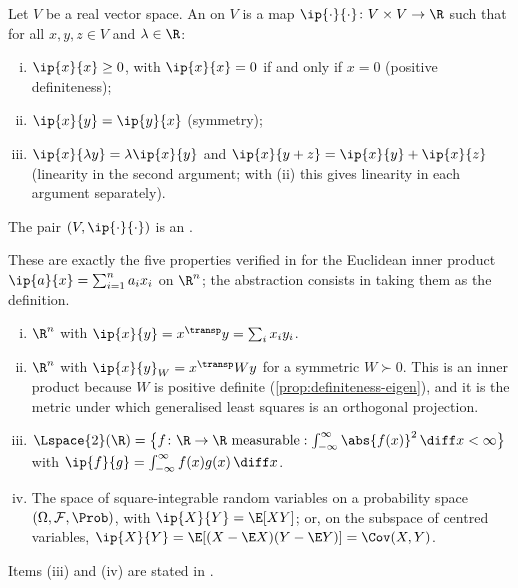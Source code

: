 \begin{definition}\label{def:inner-product}
	Let $V$ be a real vector space. An  on $V$ is a map
	$\ip{\cdot}{\cdot}\colon V\times V\to\R$ such that for all $x,y,z\in V$ and
	$\lambda\in\R$:
	\begin{enumerate}[(i)]
		\item $\ip{x}{x}\geq0$, with $\ip{x}{x}=0$ if and only if $x=0$
		      (positive definiteness);
		\item $\ip{x}{y}=\ip{y}{x}$ (symmetry);
		\item $\ip{x}{\lambda y}=\lambda\ip{x}{y}$ and
		      $\ip{x}{y+z}=\ip{x}{y}+\ip{x}{z}$ (linearity in the second argument;
		      with (ii) this gives linearity in each argument separately).
	\end{enumerate}
	The pair $(V,\ip{\cdot}{\cdot})$ is an .
\end{definition}

These are exactly the five properties verified in
\autocite[slides 5--6]{fukuda2026analysis} for the Euclidean inner product
$\ip{a}{x}=\sum_{i=1}^n a_ix_i$ on $\R^n$; the abstraction consists in taking
them as the definition.

\begin{eg}\label{eg:ip-spaces}
	\begin{enumerate}[(i)]
		\item $\R^n$ with $\ip{x}{y}=x^{\transp}y=\sum_ix_iy_i$.
		\item $\R^n$ with $\ip{x}{y}_W=x^{\transp}Wy$ for a symmetric $W\succ0$. This is
		      an inner product because $W$ is positive definite
		      (\autoref{prop:definiteness-eigen}), and it is the metric under which
		      generalised least squares is an orthogonal projection.
		\item $\Lspace{2}(\R)=\bigl\{f\colon\R\to\R \text{ measurable}:
			      \int_{-\infty}^{\infty}\abs{f(x)}^2\,\diff x<\infty\bigr\}$ with
		      $\ip{f}{g}=\int_{-\infty}^{\infty}f(x)g(x)\,\diff x$.
		\item The space of square-integrable random variables on a probability space
		      $(\Omega,\mathcal{F},\Prob)$, with $\ip{X}{Y}=\E[XY]$; or, on the subspace
		      of centred variables, $\ip{X}{Y}=\E[(X-\E X)(Y-\E Y)]=\Cov(X,Y)$.
	\end{enumerate}
	Items (iii) and (iv) are stated in \autocite[slide 7]{fukuda2026analysis}.
\end{eg}

